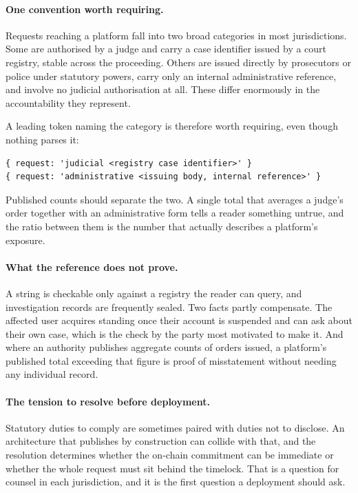 \documentclass[11pt,a4paper]{article}
\begin{document}
\paragraph{One convention worth requiring.} Requests reaching a platform fall
into two broad categories in most jurisdictions. Some are authorised by a judge
and carry a case identifier issued by a court registry, stable across the
proceeding. Others are issued directly by prosecutors or police under statutory
powers, carry only an internal administrative reference, and involve no judicial
authorisation at all. These differ enormously in the accountability they
represent.

A leading token naming the category is therefore worth requiring, even though
nothing parses it:

\begin{verbatim}
{ request: 'judicial <registry case identifier>' }
{ request: 'administrative <issuing body, internal reference>' }
\end{verbatim}

Published counts should separate the two. A single total that averages a judge's
order together with an administrative form tells a reader something untrue, and
the ratio between them is the number that actually describes a platform's
exposure.

\paragraph{What the reference does not prove.} A string is checkable only against
a registry the reader can query, and investigation records are frequently sealed.
Two facts partly compensate. The affected user acquires standing once their
account is suspended and can ask about their own case, which is the check by the
party most motivated to make it. And where an authority publishes aggregate
counts of orders issued, a platform's published total exceeding that figure is
proof of misstatement without needing any individual record.

\paragraph{The tension to resolve before deployment.} Statutory duties to comply
are sometimes paired with duties not to disclose. An architecture that publishes
by construction can collide with that, and the resolution determines whether the
on-chain commitment can be immediate or whether the whole request must sit behind
the timelock. That is a question for counsel in each jurisdiction, and it is the
first question a deployment should ask.
\end{document}
